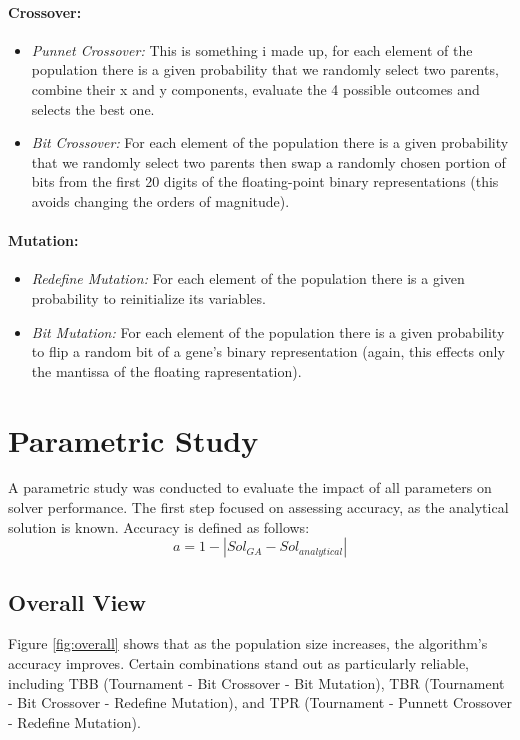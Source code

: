\documentclass[11pt,a4paper,twoside]{article}
\begin{document}
    \paragraph{Crossover:} 
    \begin{itemize}
        \item \textit{Punnet Crossover:} This is something i made up, for each element of the population there is a given probability that we randomly select two parents, combine their x and y components, evaluate the 4 possible outcomes and selects the best one.
        \item \textit{Bit Crossover:} For each element of the population there is a given probability that we randomly select two parents then swap a randomly chosen portion of bits from the first 20 digits of the floating-point binary representations (this avoids changing the orders of magnitude).
    \end{itemize}
    \paragraph{Mutation:}
    \begin{itemize}
        \item \textit{Redefine Mutation:} For each element of the population there is a given probability to reinitialize its variables.
        \item \textit{Bit Mutation:} For each element of the population there is a given probability to flip a random bit of a gene's binary representation (again, this effects only the mantissa of the floating rapresentation).
    \end{itemize}


\section{Parametric Study}
A parametric study was conducted to evaluate the impact of all parameters on solver performance. The first step focused on assessing accuracy, as the analytical solution is known. Accuracy is defined as follows:
\begin{equation}
    a = 1 - |{Sol_{GA} - Sol_{analytical}}|
\end{equation}


\subsection{Overall View}

Figure \ref{fig:overall} shows that as the population size increases, the algorithm's accuracy improves. Certain combinations stand out as particularly reliable, including TBB (Tournament - Bit Crossover - Bit Mutation), TBR (Tournament - Bit Crossover - Redefine Mutation), and TPR (Tournament - Punnett Crossover - Redefine Mutation).
\end{document}
